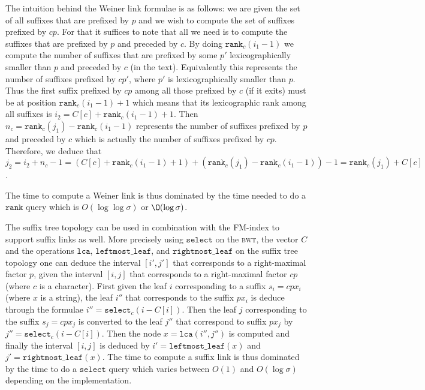 \documentclass[a4paper]{article}
\begin{document}
The intuition behind the Weiner link formulae is as follows: we are given the set of all suffixes that are prefixed by $p$ and we wish to compute the set of suffixes prefixed by $cp$. For that it suffices to note that all we need is to compute the suffixes that are prefixed by $p$ and preceded by $c$. By doing $\mathtt{rank}_c(i_1-1)$ we compute the number of suffixes that are prefixed by some  $p'$ lexicographically smaller than $p$ and preceded by $c$ (in the text). Equivalently this represents the number of suffixes prefixed by $cp'$, where $p'$ is lexicographically smaller than $p$. Thus the first suffix prefixed by $cp$ among all those prefixed by $c$ (if it exits) must be at position $\mathtt{rank}_c(i_1-1)+1$ which means that its lexicographic rank among all suffixes is $i_2=C[c]+\mathtt{rank}_c(i_1-1)+1$. Then $n_c=\mathtt{rank}_c(j_1)-\mathtt{rank}_c(i_1-1)$ represents the number of suffixes prefixed by $p$ and preceded by $c$ which is actually the number of suffixes prefixed by $cp$. Therefore, we deduce that $j_2=i_2+n_c-1=(C[c]+\mathtt{rank}_c(i_1-1)+1)+(\mathtt{rank}_c(j_1)-\mathtt{rank}_c(i_1-1))-1=\mathtt{rank}_c(j_1)+C[c]$. 

The time to compute a Weiner link is thus dominated by the time needed to do a $\mathtt{rank}$ query which is $O(\log\log\sigma)$ or $\O(\log\sigma)$. 

The suffix tree topology can be used in combination with the FM-index to support suffix links as well. 
More precisely using $\mathtt{select}$ on the \textsc{bwt}, the vector $C$ and the operations $\mathtt{lca}$, $\mathtt{leftmost\_leaf}$,
and $\mathtt{rightmost\_leaf}$ on the suffix tree topology one can deduce the interval $[i',j']$ that corresponds
to a right-maximal factor $p$, given the interval $[i,j]$ that corresponds to a right-maximal factor $cp$ (where 
$c$ is a character). First given the leaf $i$ corresponding to a suffix $s_i=cpx_i$ (where $x$ is a string), the leaf $i''$ that corresponds to the suffix $px_i$ is deduce through the formulae $i''=\mathtt{select}_c(i-C[i])$. Then the leaf $j$ corresponding to the suffix $s_j=cpx_j$ is converted to the leaf $j''$ that correspond to suffix $px_j$ by $j''=\mathtt{select}_c(i-C[i])$. Then the node $x=\mathtt{lca}(i'',j'')$ is computed and finally the interval $[i,j]$ is deduced by 
$i'=\mathtt{leftmost\_leaf}(x)$ and $j'=\mathtt{rightmost\_leaf}(x)$. 
The time to compute a suffix link is thus dominated by the time to do a $\mathtt{select}$ query which varies between $O(1)$ and $O(\log\sigma)$ depending on the implementation. 
\end{document}
